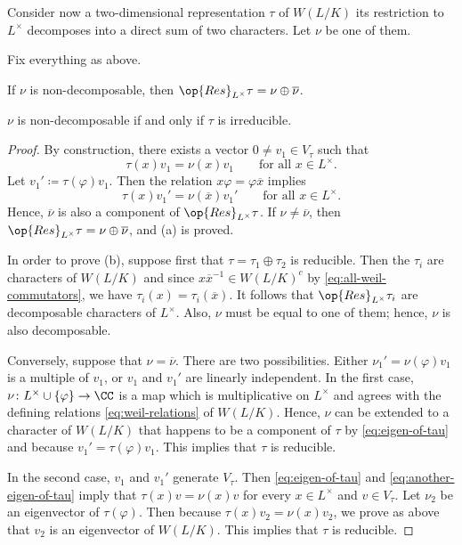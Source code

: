 \documentclass[../main.tex]{subfiles}
\begin{document}
Consider now a two-dimensional representation $\tau$ of $W(L/K)$ its restriction to $L^\times$ decomposes into a direct sum of two characters. Let $\nu$ be one of them.
\begin{lemma} \label{lem:res-weil-rep}
	Fix everything as above.
	\begin{listalph}
		\item If $\nu$ is non-decomposable, then $\op{Res}_{L^\times}\tau=\nu\oplus\overline\nu$.
		\item $\nu$ is non-decomposable if and only if $\tau$ is irreducible.
	\end{listalph}
\end{lemma}
\begin{proof}
	By construction, there exists a vector $0\ne v_1\in V_\tau$ such that
	\begin{equation}
		\tau(x)v_1=\nu(x)v_1\qquad\text{for all }x\in L^\times. \label{eq:eigen-of-tau}
	\end{equation}
	Let $v_1'\coloneqq\tau(\varphi)v_1$. Then the relation $x\varphi=\varphi\overline x$ implies
	\begin{equation}
		\tau(x)v_1'=\nu(\overline x)v_1'\qquad\text{for all }x\in L^\times. \label{eq:another-eigen-of-tau}
	\end{equation}
	Hence, $\overline\nu$ is also a component of $\op{Res}_{L^\times}\tau$. If $\nu\ne\overline\nu$, then $\op{Res}_{L^\times}\tau=\nu\oplus\overline\nu$, and (a) is proved.

	In order to prove (b), suppose first that $\tau=\tau_1\oplus\tau_2$ is reducible. Then the $\tau_i$ are characters of $W(L/K)$ and since $x\overline x^{-1}\in W(L/K)^c$ by \eqref{eq:all-weil-commutators}, we have $\tau_i(x)=\tau_i(\overline x)$. It follows that $\op{Res}_{L^\times}\tau_i$ are decomposable characters of $L^\times$. Also, $\nu$ must be equal to one of them; hence, $\nu$ is also decomposable.

	Conversely, suppose that $\nu=\overline\nu$. There are two possibilities. Either $\nu_1'=\nu(\varphi)v_1$ is a multiple of $v_1$, or $v_1$ and $v_1'$ are linearly independent. In the first case, $\nu\colon L^\times\cup\{\varphi\}\to\CC$ is a map which is multiplicative on $L^\times$ and agrees with the defining relations \eqref{eq:weil-relations} of $W(L/K)$. Hence, $\nu$ can be extended to a character of $W(L/K)$ that happens to be a component of $\tau$ by \eqref{eq:eigen-of-tau} and because $v_1'=\tau(\varphi)v_1$. This implies that $\tau$ is reducible.

	In the second case, $v_1$ and $v_1'$ generate $V_\tau$. Then \eqref{eq:eigen-of-tau} and \eqref{eq:another-eigen-of-tau} imply that $\tau(x)v=\nu(x)v$ for every $x\in L^\times$ and $v\in V_\tau$. Let $\nu_2$ be an eigenvector of $\tau(\varphi)$. Then because $\tau(x)v_2=\nu(x)v_2$, we prove as above that $v_2$ is an eigenvector of $W(L/K)$. This implies that $\tau$ is reducible.
\end{proof}
\end{document}
